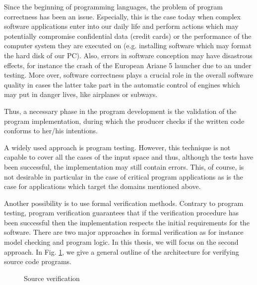 
Since the beginning of programming languages, the problem of program correctness has been an issue. 
Especially, this is the case today when complex software applications  enter into our daily life and perform actions 
which may potentially compromise confidential data (credit cards) or the performance of the
 computer system they are executed on (e.g. installing software which may format the hard disk of our PC).
Also, errors in software conception may have disastrous effects, for instance
the crash of the European Ariane 5 launcher due to an under testing. More over, software correctness
 plays a crucial role in the overall software quality  in cases the latter take part in the automatic 
control of engines which may put in danger lives, like airplanes or subways.


Thus, a necessary phase in the program development is the validation of the program implementation, during which 
the producer checks if the written code conforms to her/his intentions. 


A widely used approach is program testing. However, this technique is not capable
to cover all the cases of the input space and thus, although the tests have been successful, 
the implementation may still contain errors. This, of course, is not desirable in particular in the case of critical 
program applications as is the case for applications which target the domains mentioned above.

 Another possibility is to use formal verification methods. 
Contrary to program testing,  program verification guarantees that if the verification procedure  
has been successful then the implementation respects the initial requirements for the software. There are two major approaches 
in formal verification as for instance model checking and program logic. In this thesis, we will focus on the second approach.  
In Fig. \ref{intro:srcVerif}, we give a general outline of the architecture for verifying source code programs.
\begin{figure}[ht!]
\begin{center}
\caption{\sc Source verification}
\label{intro:srcVerif}
\end{center}
\end{figure}

